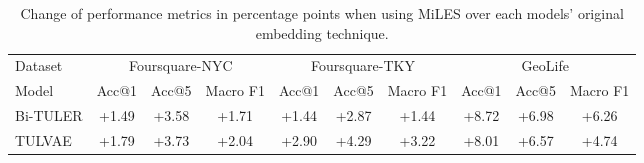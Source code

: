 \documentclass{article} %
\theoremstyle{definition}
\begin{document}
\begin{table}[h]
    \caption{Change of performance metrics in percentage points when using MiLES over each models' original embedding technique.}
    \label{tab:miles_improvements}
    \begin{tabular}{lccccccccc}
        \toprule
        Dataset  & \multicolumn{3}{c}{Foursquare-NYC}                    & \multicolumn{3}{c}{Foursquare-TKY}                    & \multicolumn{3}{c}{GeoLife}                                                                                                                                                                                                                                                                                                                                                                           \\
        \cmidrule(lr){2-4} \cmidrule(lr){5-7} \cmidrule(lr){8-10}
        Model    & Acc@1                                                 & Acc@5                                                 & Macro F1                                              & Acc@1                                                 & Acc@5                                                 & Macro F1                                              & Acc@1                                                 & Acc@5                                                 & Macro F1                                              \\
        \midrule
        Bi-TULER & {\cellcolor[HTML]{E8F59F}} \color[HTML]{000000} +1.49 & {\cellcolor[HTML]{BFE47A}} \color[HTML]{000000} +3.58 & {\cellcolor[HTML]{E3F399}} \color[HTML]{000000} +1.71 & {\cellcolor[HTML]{E8F59F}} \color[HTML]{000000} +1.44 & {\cellcolor[HTML]{CFEB85}} \color[HTML]{000000} +2.87 & {\cellcolor[HTML]{E8F59F}} \color[HTML]{000000} +1.44 & {\cellcolor[HTML]{36A657}} \color[HTML]{000000} +8.72 & {\cellcolor[HTML]{6BBF64}} \color[HTML]{000000} +6.98 & {\cellcolor[HTML]{7FC866}} \color[HTML]{000000} +6.26 \\
        TULVAE   & {\cellcolor[HTML]{E2F397}} \color[HTML]{000000} +1.79 & {\cellcolor[HTML]{BDE379}} \color[HTML]{000000} +3.73 & {\cellcolor[HTML]{DFF293}} \color[HTML]{000000} +2.04 & {\cellcolor[HTML]{CFEB85}} \color[HTML]{000000} +2.90 & {\cellcolor[HTML]{B1DE71}} \color[HTML]{000000} +4.29 & {\cellcolor[HTML]{C7E77F}} \color[HTML]{000000} +3.22 & {\cellcolor[HTML]{4BB05C}} \color[HTML]{000000} +8.01 & {\cellcolor[HTML]{75C465}} \color[HTML]{000000} +6.57 & {\cellcolor[HTML]{A7D96B}} \color[HTML]{000000} +4.74 \\

\end{tabular}
\end{table}
\end{document}
